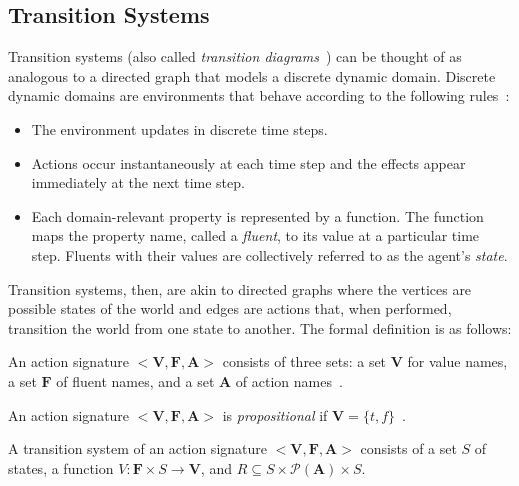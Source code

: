 \subsection{Transition Systems}
\label{subsec:transition_systems}

Transition systems (also called \textit{transition diagrams}~\citep{blount_architecture_2013}) can be thought of as analogous to a directed graph that models a discrete dynamic domain.
Discrete dynamic domains are environments that behave according to the following rules~\citep{blount_architecture_2013}:

\begin{itemize}
    \item The environment updates in discrete time steps.
    \item Actions occur instantaneously at each time step and the effects appear immediately at the next time step.
    \item Each domain-relevant property is represented by a function.
        The function maps the property name, called a \textit{fluent}, to its value at a particular time step.
        Fluents with their values are collectively referred to as the agent's \textit{state}.
\end{itemize}

Transition systems, then, are akin to directed graphs where the vertices are possible states of the world and edges are actions that, when performed, transition the world from one state to another.
The formal definition is as follows:

\begin{definition}
    An action signature $ < \boldsymbol{V}, \boldsymbol{F}, \boldsymbol{A}> $ consists of three sets: a set $ \boldsymbol{V} $ for value names, a set $ \boldsymbol{F} $ of fluent names, and a set $ \boldsymbol{A} $ of action names~\citep{gelfond_action_1998}.
\end{definition}

\begin{definition}
    An action signature $< \boldsymbol{V}, \boldsymbol{F}, \boldsymbol{A}>$ is \textit{propositional} if $\boldsymbol{V}=\{t,f\}$~\citep{gelfond_action_1998}.
\end{definition}

\begin{definition}
    A transition system of an action signature $ < \boldsymbol{V}, \boldsymbol{F}, \boldsymbol{A}> $ consists of a set $ S $ of states, a function $ V : \boldsymbol{F} \times S\rightarrow \boldsymbol{V} $, and $ R \subseteq S \times \mathcal{P}(\boldsymbol{A}) \times S $.
\end{definition}

